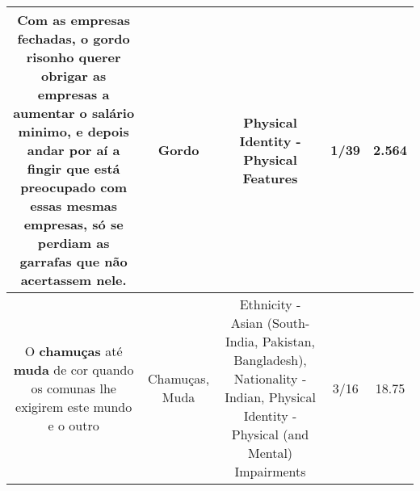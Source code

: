 \documentclass[11pt]{article}
\newlength\mylength
\begin{document}
\begin{center}
\begin{longtable}{|C{.65\mylength}|C{.30\mylength}|C{.12\mylength}|C{.12\mylength}|C{.12\mylength}|}
  \small Com as empresas fechadas, o \textbf{gordo} risonho querer obrigar as empresas a aumentar o salário minimo, e depois andar por aí a fingir que está preocupado com essas mesmas empresas, só se perdiam as garrafas que não acertassem nele.\normalsize   & Gordo & Physical Identity - Physical Features & 1/39 & 2.564 \\  \hline
  \small O \textbf{c\textbf{hamuças}} até \textbf{muda} de cor quando os comunas lhe exigirem este mundo e o outro\normalsize   & Chamuças, Muda & Ethnicity - Asian (South- India, Pakistan, Bangladesh), Nationality - Indian, Physical Identity - Physical (and Mental) Impairments & 3/16 & 18.75 \\  \hline
  
\end{longtable}
\end{center}
\end{document}
